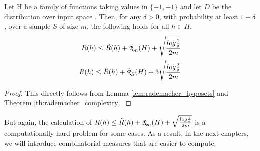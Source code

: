 \documentclass[../main]{subfiles}
\begin{document}
\begin{theorem} \label{th:rademacher_bounds_binary_classification}
Let H be a family of functions taking values in $\{+1,-1\}$ and let $D$ be the distribution
over input space . Then, for any $\delta>0$, with probability at least $1-\delta$,
over a sample $S$ of size $m$, the following holds for all $h \in H$.
\begin{align}
R(h) \leq \hat{R}(h) + \cursive{R}_m(H) + \sqrt{\frac{log\frac{1}{\delta}}{2m}} \\
R(h) \leq \hat{R}(h) + \hat{\cursive{R}}_S(H) + 3\sqrt{\frac{log\frac{2}{\delta}}{2m}}
\end{align}
\end{theorem}
\begin{proof}
This directly follows from Lemma \ref{lem:rademacher_hyposets} and Theorem
\ref{th:rademacher_complexity}.
\end{proof}

But again, the calculation of $R(h) \leq \hat{R}(h) + \cursive{R}_m(H) + \sqrt{\frac{log\frac{1}
{\delta}}{2m}}$ is a computationally hard problem for some cases. As a result, in the next
chapters, we will introduce combinatorial measures that are easier to compute.
\end{document}
